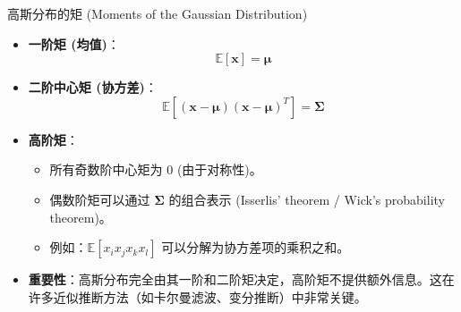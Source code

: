 \documentclass[12pt, aspectratio=169]{beamer}
\newcommand{\vect}[1]{\mathbf{#1}}
\newcommand{\E}{\mathbb{E}}
\begin{document}
\begin{frame}{高斯分布的矩 (Moments of the Gaussian Distribution)}
    \begin{itemize}
        \item \textbf{一阶矩 (均值)}：
        $$ \E[\vect{x}] = \boldsymbol{\mu} $$
        \item \textbf{二阶中心矩 (协方差)}：
        $$ \E[(\vect{x}-\boldsymbol{\mu})(\vect{x}-\boldsymbol{\mu})^T] = \boldsymbol{\Sigma} $$
        \item \textbf{高阶矩}：
        \begin{itemize}
            \item 所有奇数阶中心矩为 0 (由于对称性)。
            \item 偶数阶矩可以通过 $\boldsymbol{\Sigma}$ 的组合表示 (Isserlis' theorem / Wick's probability theorem)。
            \item 例如：$\E[x_i x_j x_k x_l]$ 可以分解为协方差项的乘积之和。
        \end{itemize}
        \item \textbf{重要性}：高斯分布完全由其一阶和二阶矩决定，高阶矩不提供额外信息。这在许多近似推断方法（如卡尔曼滤波、变分推断）中非常关键。
    \end{itemize}
\end{frame}
\end{document}

